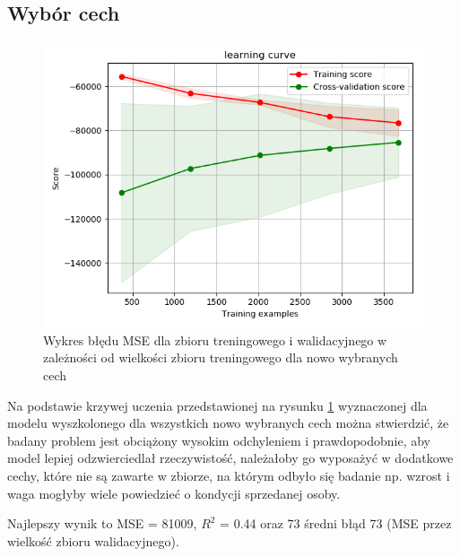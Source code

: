 \documentclass[a4paper,12pt]{article}
\begin{document}
	\subsection{Wybór cech}
	\begin{figure}[h]
		\centering
		\includegraphics[scale=0.6]{obrazy/learning_curve_new.png} 
		\caption{Wykres błędu MSE dla zbioru treningowego i walidacyjnego w zależności od wielkości zbioru treningowego dla nowo wybranych cech}
		\label{learning_curve_new}
	\end{figure}	
	Na podstawie krzywej uczenia przedstawionej na rysunku \ref{learning_curve_new} wyznaczonej dla modelu wyszkolonego dla wszystkich nowo wybranych cech można stwierdzić, że badany problem jest obciążony wysokim odchyleniem i prawdopodobnie, aby model lepiej odzwierciedlał rzeczywistość, należałoby go wyposażyć w dodatkowe cechy, które nie są zawarte w zbiorze, na którym odbyło się badanie np. wzrost i waga mogłyby wiele powiedzieć o kondycji sprzedanej osoby.
	
	Najlepszy wynik to MSE = 81009, $R^2$ = 0.44 oraz 73 średni błąd 73 (MSE przez wielkość zbioru walidacyjnego).
	
\end{document}
